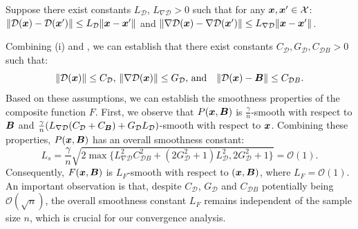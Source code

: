 \begin{assumption}
     \label{Ass: the properties of D} Suppose there
    exist constants $L_{\mathcal{D}},\, L_{\nabla \mathcal{D}}>0$ such that for any
    $\bm{x}, \bm{x}' \in \mathcal{X}$:
    $\|\mathcal{D}(\bm{x}) - \mathcal{D}(\bm{x}')\| \leq L_{\mathcal{D}}\|\bm{x} - \bm{x}'\|$
    and
    $\|\nabla \mathcal{D}(\bm{x}) - \nabla \mathcal{D}(\bm{x}')\| \leq L_{\nabla
    \mathcal{D}}\|\bm{x} - \bm{x}'\|$.
\end{assumption}

Combining (i) and ,
we can establish that there exist constants
$C_{\mathcal{D}}, G_{\mathcal{D}}, C_{\mathcal{D}B}> 0$ such that:
\[
    \|\mathcal{D}(\bm{x})\| \leq C_{\mathcal{D}}, \, \|\nabla \mathcal{D}(\bm{x})\|
    \leq G_{\mathcal{D}}, \, \text{and}\quad \|\mathcal{D}(\bm{x}) - \bm{B}\| \leq C
    _{\mathcal{D}B}.
\]
Based on these assumptions, we can establish the smoothness properties of the composite
function $F$. First, we observe that $P(\bm{x}, \bm{B})$ is $\frac{\gamma}{n}$-smooth with
respect to $\bm{B}$ and $\frac{\gamma}{n}(L_{\nabla \mathcal{D}}(C_{\mathcal{D}}+ C_{\bm{B}}
) + G_{\mathcal{D}}L_{\mathcal{D}})$-smooth with respect to $\bm{x}$. Combining
these properties, $P(\bm{x}, \bm{B})$ has an overall smoothness constant:
\[
    L_{s}= \frac{\gamma}{n}\sqrt{2\max\{L^{2}_{\nabla \mathcal{D}}C^{2}_{\mathcal{D}B}+
    (2G_{\mathcal{D}}^{2}+ 1)L^{2}_{\mathcal{D}}, 2G_{\mathcal{D}}^{2}+ 1\}}= \mathcal{O}
    (1).
\]Consequently, $F(\bm{x}, \bm{B})$ is $L_{F}$-smooth with respect to $(\bm{x}, \bm{B})$, where
$L_{F}= \mathcal{O}(1)$. An important observation is that, despite $C_{\mathcal{D}}$,
$G_{\mathcal{D}}$ and $C_{\mathcal{D}B}$ potentially being
$\mathcal{O}(\sqrt{n})$, the overall smoothness constant $L_{F}$ remains independent
of the sample size $n$, which is crucial for our convergence analysis.

